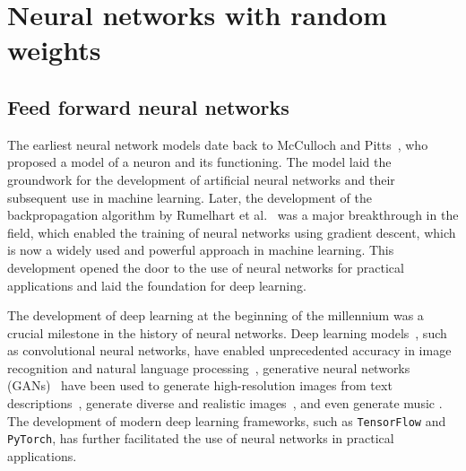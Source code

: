 
\section{Neural networks with random weights}

\subsection{Feed forward neural networks}\label{sec:NN}
The earliest neural network models date back to McCulloch and Pitts~\cite{McCulloch1943AActivity}, who proposed a model of a neuron and its functioning. The model laid the groundwork for the development of artificial neural networks and their subsequent use in machine learning. Later, the development of the backpropagation algorithm by Rumelhart et al.~\cite{Rumelhart1986LearningErrors} was a major breakthrough in the field, which enabled the training of neural networks using gradient descent, which is now a widely used and powerful approach in machine learning. This development opened the door to the use of neural networks for practical applications and laid the foundation for deep learning. 

The development of deep learning at the beginning of the millennium was a crucial milestone in the history of neural networks. Deep learning models~\cite{Goodfellow2016DeepLearning}, such as convolutional neural networks, have enabled unprecedented accuracy in image recognition and natural language processing~\cite{Gu2018RecentNetworks}, generative neural networks (GANs)~\cite{Goodfellow2020GenerativeNetworks} have been used to generate high-resolution images from text descriptions~\cite{Radford2015UnsupervisedNetworks}, generate diverse and realistic images~\cite{Karras2019ANetworks}, and even generate music \cite{Engel2019GANSynth:Synthesis}. The development of modern deep learning frameworks, such as \texttt{TensorFlow} and \texttt{PyTorch}, has further facilitated the use of neural networks in practical applications. 

